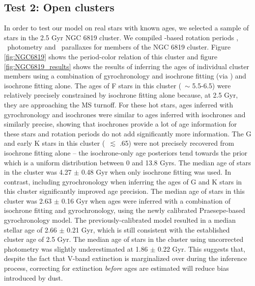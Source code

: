 \subsection{Test 2: Open clusters}
In order to test our model on real stars with known ages, we selected a sample
of stars in the 2.5 Gyr NGC 6819 cluster.
We compiled \kepler-based rotation periods \citep{meibom2015}, \Gaia\
photometry and \gaia\ parallaxes for members of the NGC 6819 cluster.
Figure \ref{fig:NGC6819} shows the period-color relation of this
cluster and figure \ref{fig:NGC6819_results} shows the results of inferring
the ages of individual cluster members using a combination of gyrochronology
and isochrone fitting (via \sd) and isochrone fitting alone.
The ages of F stars in this cluster (\gcolor\ $\sim$ 5.5-6.5) were relatively
precisely constrained by isochrone fitting alone because, at 2.5 Gyr, they are
approaching the MS turnoff.
For these hot stars, ages inferred with gyrochronology and isochrones were
similar to ages inferred with isochrones and similarly precise, showing that
isochrones provide a lot of age information for these stars and rotation
periods do not add significantly more information.
The G and early K stars in this cluster (\gcolor\ $\lesssim$ .65) were not
precisely recovered from isochrone fitting alone -- the isochrone-only age
posteriors tend towards the prior which is a uniform distribution between 0
and 13.8 Gyrs.
The median age of stars in the cluster was 4.27 $\pm$ 0.48 Gyr when only
isochrone fitting was used.
In contrast, including gyrochronology when inferring the ages of G and K stars
in this cluster significantly improved age precision.
The median age of stars in this cluster was 2.63 $\pm$ 0.16 Gyr when ages were
inferred with a combination of isochrone fitting and gyrochronology, using the
newly calibrated Praesepe-based gyrochronology model.
The previously-calibrated \citet{angus2015} model resulted in a median stellar
age of 2.66 $\pm$ 0.21 Gyr, which is still consistent with the established
cluster age of 2.5 Gyr.
The median age of stars in the cluster using uncorrected photometry was
slightly underestimated at 1.86 $\pm$ 0.22 Gyr.
This suggests that, despite the fact that V-band extinction is marginalized
over during the inference process, correcting for extinction {\it before} ages
are estimated will reduce bias introduced by dust.

